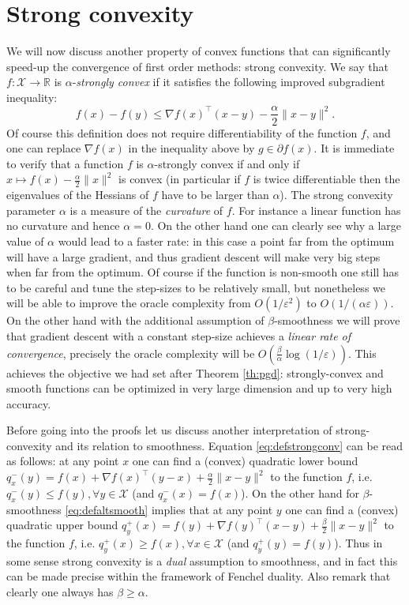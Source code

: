 \documentclass[openany]{now}
\newcommand{\cX}{\mathcal{X}}
\renewcommand{\epsilon}{\varepsilon}
\begin{document}
\section{Strong convexity}
We will now discuss another property of convex functions that can significantly speed-up the convergence of first order methods: strong convexity. We say that $f: \cX \rightarrow \mathbb{R}$ is $\alpha$-{\em strongly convex} if it satisfies the following improved subgradient inequality:
\begin{equation} \label{eq:defstrongconv}
f(x) - f(y) \leq \nabla f(x)^{\top} (x - y) - \frac{\alpha}{2} \|x - y \|^2 .
\end{equation}
Of course this definition does not require differentiability of the function $f$, and one can replace $\nabla f(x)$ in the inequality above by $g \in \partial f(x)$. It is immediate to verify that a function $f$ is $\alpha$-strongly convex if and only if $x \mapsto f(x) - \frac{\alpha}{2} \|x\|^2$ is convex (in particular if $f$ is twice differentiable then the eigenvalues of the Hessians of $f$ have to be larger than $\alpha$). The strong convexity parameter $\alpha$ is a measure of the {\em curvature} of $f$. For instance a linear function has no curvature and hence $\alpha = 0$. On the other hand one can clearly see why a large value of $\alpha$ would lead to a faster rate: in this case a point far from the optimum will have a large gradient, and thus gradient descent will make very big steps when far from the optimum. Of course if the function is non-smooth one still has to be careful and tune the step-sizes to be relatively small, but nonetheless we will be able to improve the oracle complexity from $O(1/\epsilon^2)$ to $O(1/(\alpha \epsilon))$. On the other hand with the additional assumption of $\beta$-smoothness we will prove that gradient descent with a constant step-size achieves a {\em linear rate of convergence}, precisely the oracle complexity will be $O(\frac{\beta}{\alpha} \log(1/\epsilon))$. This achieves the objective we had set after Theorem \ref{th:pgd}: strongly-convex and smooth functions can be optimized in very large dimension and up to very high accuracy.

Before going into the proofs let us discuss another interpretation of strong-convexity and its relation to smoothness. Equation \eqref{eq:defstrongconv} can be read as follows: at any point $x$ one can find a (convex) quadratic lower bound $q_x^-(y) = f(x) + \nabla f(x)^{\top} (y - x) + \frac{\alpha}{2} \|x - y \|^2$ to the function $f$, i.e. $q_x^-(y) \leq f(y), \forall y \in \cX$ (and $q_x^-(x) = f(x)$). On the other hand for $\beta$-smoothness \eqref{eq:defaltsmooth}
implies that at any point $y$ one can find a (convex) quadratic upper bound $q_y^+(x) = f(y) + \nabla f(y)^{\top} (x - y) + \frac{\beta}{2} \|x - y \|^2$ to the function $f$, i.e. $q_y^+(x) \geq f(x), \forall x \in \cX$ (and $q_y^+(y) = f(y)$). 
Thus in some sense strong convexity is a {\em dual} assumption to smoothness, and in fact this can be made precise within the framework of Fenchel duality. Also remark that clearly one always has $\beta \geq \alpha$.
\end{document}
